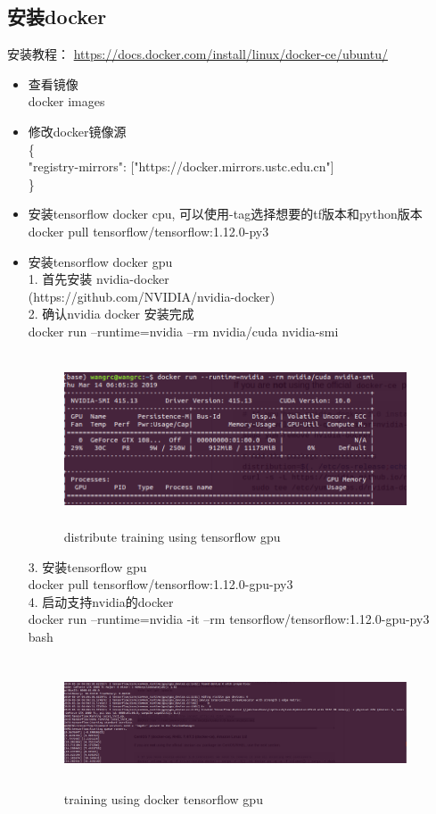 \documentclass{article}
\begin{document}
\begin{CJK*}{UTF8}{gbsn}
\subsection{安装docker}
安装教程：
\url{https://docs.docker.com/install/linux/docker-ce/ubuntu/}


\noindent
\begin{itemize}
\item 查看镜像\\
docker images
\item 修改docker镜像源\\
\{ \\
"registry-mirrors": ["https://docker.mirrors.ustc.edu.cn"] \\
\}
\item 安装tensorflow docker cpu, 可以使用-tag选择想要的tf版本和python版本 \\
docker pull tensorflow/tensorflow:1.12.0-py3
\item 安装tensorflow docker gpu \\
1. 首先安装 nvidia-docker \\(https://github.com/NVIDIA/nvidia-docker)\\
2. 确认nvidia docker 安装完成\\
docker run --runtime=nvidia --rm nvidia/cuda nvidia-smi \\
\begin{figure}[H]
\centering
\includegraphics[width=4in,height=2in]{5}
\caption{distribute training using tensorflow gpu}
\end{figure}

3. 安装tensorflow gpu \\
docker pull tensorflow/tensorflow:1.12.0-gpu-py3\\
4. 启动支持nvidia的docker \\
docker run --runtime=nvidia -it --rm tensorflow/tensorflow:1.12.0-gpu-py3 bash\\
\begin{figure}[H]
\centering
\includegraphics[width=4in,height=1.5in]{6}
\caption{training using docker tensorflow gpu}
\end{figure}
\end{itemize}


\end{CJK*}
\end{document}
